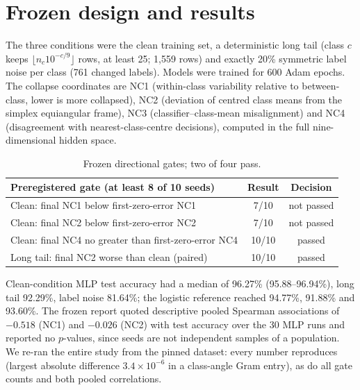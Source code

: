 \documentclass[11pt]{article}
\begin{document}
\section{Frozen design and results}
The three conditions were the clean training set, a deterministic long tail (class $c$ keeps $\lfloor n_c10^{-c/9}\rfloor$ rows, at
least 25; 1{,}559 rows) and exactly 20\% symmetric label noise per class (761 changed labels). Models were trained for 600 Adam epochs.
The collapse coordinates are NC1 (within-class variability relative to between-class, lower is more collapsed), NC2 (deviation
of centred class means from the simplex equiangular frame), NC3 (classifier--class-mean misalignment) and NC4 (disagreement with
nearest-class-centre decisions), computed in the full nine-dimensional hidden space.
\begin{table}[h]
\centering\small
\begin{tabular}{lcc}
\toprule
Preregistered gate (at least 8 of 10 seeds) & Result & Decision\\
\midrule
Clean: final NC1 below first-zero-error NC1 & 7/10 & not passed\\
Clean: final NC2 below first-zero-error NC2 & 7/10 & not passed\\
Clean: final NC4 no greater than first-zero-error NC4 & 10/10 & passed\\
Long tail: final NC2 worse than clean (paired) & 10/10 & passed\\
\bottomrule
\end{tabular}
\caption{Frozen directional gates; two of four pass.}
\end{table}
Clean-condition MLP test accuracy had a median of 96.27\% (95.88--96.94\%), long tail 92.29\%, label noise 81.64\%; the logistic
reference reached 94.77\%, 91.88\% and 93.60\%. The frozen report quoted descriptive pooled Spearman associations of $-0.518$ (NC1)
and $-0.026$ (NC2) with test accuracy over the 30 MLP runs and reported no $p$-values, since seeds are not independent samples of a
population. We re-ran the entire study from the pinned dataset: every number reproduces (largest absolute difference
$3.4\times10^{-6}$ in a class-angle Gram entry), as do all gate counts and both pooled correlations.
\end{document}
